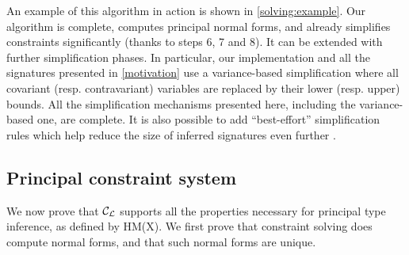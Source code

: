 An example of this algorithm in action is shown in \cref{solving:example}.
Our algorithm is complete, computes principal normal forms,
and already simplifies constraints significantly
(thanks to steps 6, 7 and 8).
It can be extended with further simplification phases.
In particular, our implementation and all the signatures presented in
\cref{motivation} use a variance-based simplification
where all covariant (resp. contravariant) variables are replaced by their
lower (resp. upper) bounds.
All the simplification mechanisms presented
here, including the variance-based one, are complete.
It is also possible to add ``best-effort'' simplification
rules which help reduce the size of inferred signatures even further
\citep{DBLP:conf/aplas/Simonet03}.


% 

\subsection{Principal constraint system}

We now prove that ${\mathcal C_{\mathcal L}}$ supports all the properties necessary for
principal type inference, as defined by HM(X).
We first prove that constraint solving
does compute normal forms, and that such normal forms are unique.


